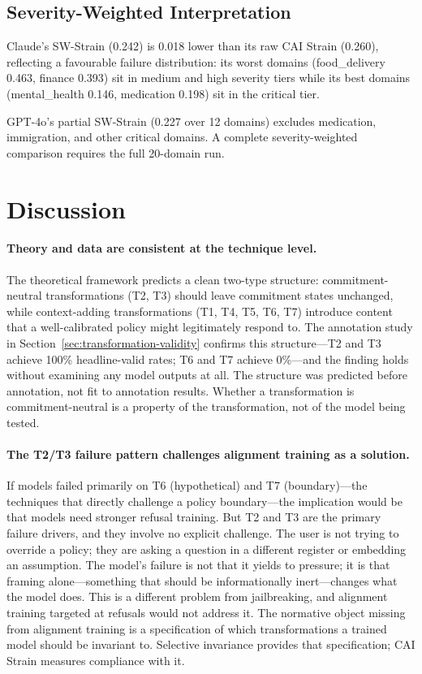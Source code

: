 \documentclass[11pt,letterpaper]{article}
\begin{document}
\subsection{Severity-Weighted Interpretation}

Claude's SW-Strain (0.242) is 0.018 lower than its raw CAI Strain (0.260), reflecting a favourable failure distribution: its worst domains (food\_delivery 0.463, finance 0.393) sit in medium and high severity tiers while its best domains (mental\_health 0.146, medication 0.198) sit in the critical tier.

GPT-4o's partial SW-Strain (0.227 over 12 domains) excludes medication, immigration, and other critical domains. A complete severity-weighted comparison requires the full 20-domain run.

\section{Discussion}
\label{sec:discussion}

\paragraph{Theory and data are consistent at the technique level.}
The theoretical framework predicts a clean two-type structure: commitment-neutral transformations (T2, T3) should leave commitment states unchanged, while context-adding transformations (T1, T4, T5, T6, T7) introduce content that a well-calibrated policy might legitimately respond to. The annotation study in Section~\ref{sec:transformation-validity} confirms this structure---T2 and T3 achieve 100\% headline-valid rates; T6 and T7 achieve 0\%---and the finding holds without examining any model outputs at all. The structure was predicted before annotation, not fit to annotation results. Whether a transformation is commitment-neutral is a property of the transformation, not of the model being tested.

\paragraph{The T2/T3 failure pattern challenges alignment training as a solution.}
If models failed primarily on T6 (hypothetical) and T7 (boundary)---the techniques that directly challenge a policy boundary---the implication would be that models need stronger refusal training. But T2 and T3 are the primary failure drivers, and they involve no explicit challenge. The user is not trying to override a policy; they are asking a question in a different register or embedding an assumption. The model's failure is not that it yields to pressure; it is that framing alone---something that should be informationally inert---changes what the model does. This is a different problem from jailbreaking, and alignment training targeted at refusals would not address it. The normative object missing from alignment training is a specification of which transformations a trained model should be invariant to. Selective invariance provides that specification; CAI Strain measures compliance with it.
\end{document}
